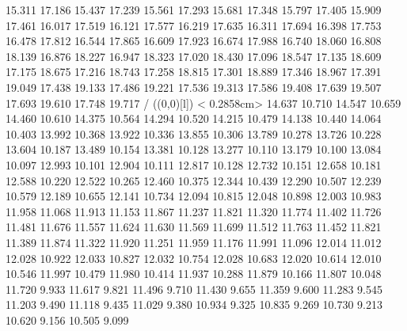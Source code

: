 {        15.311 17.186
        15.437 17.239
        15.561 17.293
        15.681 17.348
        15.797 17.405
        15.909 17.461
        16.017 17.519
        16.121 17.577
        16.219 17.635
        16.311 17.694
        16.398 17.753
        16.478 17.812
        16.544 17.865
        16.609 17.923
        16.674 17.988
        16.740 18.060
        16.808 18.139
        16.876 18.227
        16.947 18.323
        17.020 18.430
        17.096 18.547
        17.135 18.609
        17.175 18.675
        17.216 18.743
        17.258 18.815
        17.301 18.889
        17.346 18.967
        17.391 19.049
        17.438 19.133
        17.486 19.221
        17.536 19.313
        17.586 19.408
        17.639 19.507
        17.693 19.610
        17.748 19.717
        /
\linethickness=1pt
\setplotsymbol ({\makebox(0,0)[l]{\tencirc{}}})
\setdashes < 0.2858cm>
%
%
 14.637     10.710 14.547
        10.659 14.460
        10.610 14.375
        10.564 14.294
        10.520 14.215
        10.479 14.138
        10.440 14.064
        10.403 13.992
        10.368 13.922
        10.336 13.855
        10.306 13.789
        10.278 13.726
        10.228 13.604
        10.187 13.489
        10.154 13.381
        10.128 13.277
        10.110 13.179
        10.100 13.084
        10.097 12.993
        10.101 12.904
        10.111 12.817
        10.128 12.732
        10.151 12.658
        10.181 12.588
        10.220 12.522
        10.265 12.460
        10.375 12.344
        10.439 12.290
        10.507 12.239
        10.579 12.189
        10.655 12.141
        10.734 12.094
        10.815 12.048
        10.898 12.003
        10.983 11.958
        11.068 11.913
        11.153 11.867
        11.237 11.821
        11.320 11.774
        11.402 11.726
        11.481 11.676
        11.557 11.624
        11.630 11.569
        11.699 11.512
        11.763 11.452
        11.821 11.389
        11.874 11.322
        11.920 11.251
        11.959 11.176
        11.991 11.096
        12.014 11.012
        12.028 10.922
        12.033 10.827
        12.032 10.754
        12.028 10.683
        12.020 10.614
        12.010 10.546
        11.997 10.479
        11.980 10.414
        11.937 10.288
        11.879 10.166
        11.807 10.048
        11.720  9.933
        11.617  9.821
        11.496  9.710
        11.430  9.655
        11.359  9.600
        11.283  9.545
        11.203  9.490
        11.118  9.435
        11.029  9.380
        10.934  9.325
        10.835  9.269
        10.730  9.213
        10.620  9.156
        10.505  9.099
}
